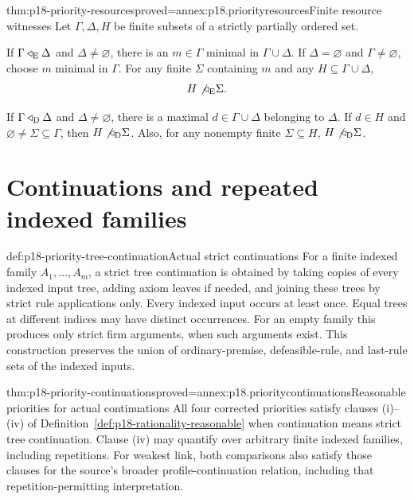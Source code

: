 \begin{hblemma}{thm:p18-priority-resources}{proved=annex:p18.priorityresources}{Finite resource witnesses}
Let \(\Gamma,\Delta,H\) be finite subsets of a strictly partially ordered
set.

If \(\Gamma\triangleleft_{\rm E}\Delta\) and
\(\Delta\ne\varnothing\), there is an \(m\in\Gamma\) minimal in
\(\Gamma\cup\Delta\). If \(\Delta=\varnothing\) and
\(\Gamma\ne\varnothing\), choose \(m\) minimal in \(\Gamma\).
For any finite \(\Sigma\) containing \(m\) and any
\(H\subseteq\Gamma\cup\Delta\),
\[
 H\not\triangleleft_{\rm E}\Sigma.
\]

If \(\Gamma\triangleleft_{\rm D}\Delta\) and
\(\Delta\ne\varnothing\), there is a maximal
\(d\in\Gamma\cup\Delta\) belonging to \(\Delta\).
If \(d\in H\) and \(\varnothing\ne\Sigma\subseteq\Gamma\), then
\(H\not\triangleleft_{\rm D}\Sigma\).
Also, for any nonempty finite \(\Sigma\subseteq H\),
\(H\not\triangleleft_{\rm D}\Sigma\).
\end{hblemma}

\section{Continuations and repeated indexed families}

\begin{hbdefinition}{def:p18-priority-tree-continuation}{Actual strict continuations}
For a finite indexed family \(A_1,\ldots,A_m\), a strict tree continuation
is obtained by taking copies of every indexed input tree, adding axiom
leaves if needed, and joining these trees by strict rule applications
only. Every indexed input occurs at least once. Equal trees at different
indices may have distinct occurrences. For an empty family this produces
only strict firm arguments, when such arguments exist.
This construction preserves the union of ordinary-premise, defeasible-rule,
and last-rule sets of the indexed inputs.
\end{hbdefinition}

\begin{hbtheorem}{thm:p18-priority-continuations}{proved=annex:p18.prioritycontinuations}{Reasonable priorities for actual continuations}
All four corrected priorities satisfy clauses (i)--(iv) of
Definition~\ref{def:p18-rationality-reasonable} when continuation means
strict tree continuation. Clause (iv) may quantify over arbitrary finite
indexed families, including repetitions.
For weakest link, both comparisons also satisfy those clauses for the
source's broader profile-continuation relation, including that
repetition-permitting interpretation.
\end{hbtheorem}


